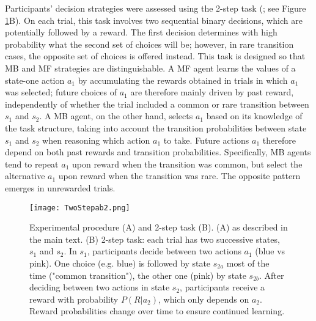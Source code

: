 \documentclass[11pt]{article} %
\begin{document}
Participants' decision strategies were assessed using the 2-step task (\cite{daw_model-based_2011}; see Figure \ref{TwoStep}B). On each trial, this task involves two sequential binary decisions, which are potentially followed by a reward. The first decision determines with high probability what the second set of choices will be; however, in rare transition cases, the opposite set of choices is offered instead. This task is designed so that MB and MF strategies are distinguishable. A MF agent learns the values of a state-one action $a_{1}$ by accumulating the rewards obtained in trials in which $a_{1}$ was selected; future choices of $a_{1}$ are therefore mainly driven by past reward, independently of whether the trial included a common or rare transition between $s_{1}$ and $s_{2}$. A MB agent, on the other hand, selects $a_{1}$ based on its knowledge of the task structure, taking into account the transition probabilities between state $s_{1}$ and $s_{2}$ when reasoning which action $a_{1}$ to take. Future actions $a_{1}$ therefore depend on both past rewards and transition probabilities. Specifically, MB agents tend to repeat $a_{1}$ upon reward when the transition was common, but select the alternative $a_{1}$ upon reward when the transition was rare. The opposite pattern emerges in unrewarded trials.
%
\begin{figure}
	\texttt{[image: TwoStepab2.png]}
	\caption{Experimental procedure (A) and 2-step task (B). (A) as described in the main text. (B) 2-step task: each trial has two successive states, $s_{1}$ and $s_{2}$. In $s_{1}$, participants decide between two actions $a_{1}$ (blue vs pink). One choice (e.g. blue) is followed by state $s_{2a}$ most of the time ("common transition"), the other one (pink) by state $s_{2b}$. After deciding between two actions in state $s_{2}$, participants receive a reward with probability $P(R|a_{2})$, which only depends on $a_{2}$. Reward probabilities change over time to ensure continued learning.}
	\label{TwoStep}
\end{figure}
%
\end{document}
